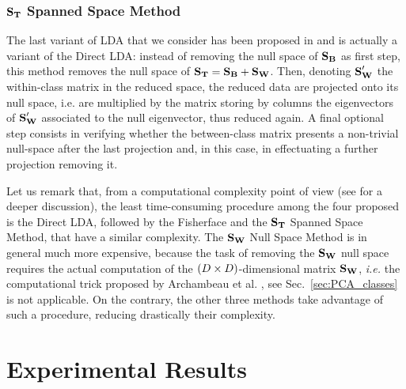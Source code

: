 \subsubsection{$\textbf{S}_{\textbf{T}}$ Spanned Space Method}
The last variant of LDA that we consider has been proposed in \cite{huang} and is actually a variant of the Direct LDA: instead of removing the null space of $\textbf{S}_{\textbf{B}}$ as first step, this method removes the null space of $\textbf{S}_{\textbf{T}} = \textbf{S}_{\textbf{B}} + \textbf{S}_{\textbf{W}}$. Then, denoting $\textbf{S}_{\textbf{W}}'$ the within-class matrix in the reduced space, the reduced data are projected onto its null space, i.e. are multiplied by the matrix storing by columns the eigenvectors of $\textbf{S}_{\textbf{W}}'$ associated to the null eigenvector, thus reduced again. A final optional step consists in verifying whether  the between-class matrix presents a non-trivial null-space after the last projection and, in this case, in effectuating a further projection removing it.

\begin{remark}
Let us remark that, from a computational complexity point of view (see \cite{huang} for a deeper discussion), the least time-consuming procedure among the four proposed is the Direct LDA, followed by the Fisherface and the $\textbf{S}_{\textbf{T}}$ Spanned Space Method, that have a similar complexity. The $\textbf{S}_{\textbf{W}}$ Null Space Method is in general much more expensive, because the task of removing the $\textbf{S}_{\textbf{W}}$ null space requires the actual computation of the $(D\times D)$-dimensional matrix $\textbf{S}_{\textbf{W}}$, {\em i.e.} the computational trick proposed by Archambeau et al. \cite{TAprincipal}, see Sec.~\ref{sec:PCA_classes} is not applicable. On the contrary, the other three methods take advantage of such a procedure, reducing drastically their complexity.
\end{remark}





\section{Experimental Results}\label{sec:experiments}

